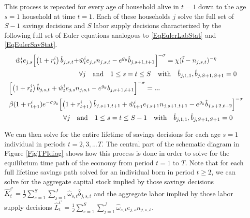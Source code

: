 \documentclass[letterpaper,12pt]{article}
\theoremstyle{definition}
\begin{document}
  This process is repeated for every age of household alive in $t=1$ down to the age $s=1$ household at time $t=1$. Each of these households $j$ solve the full set of $S-1$ savings decisions and $S$ labor supply decisions characterized by the following full set of Euler equations analogous to \eqref{EqEulerLabStat} and \eqref{EqEulerSavStat}.
  \begin{gather}
    \begin{split}
      \hat{w}^i_t e_{j,s}\Bigl[\left(1+r^i_t\right)\hat{b}_{j,s,t} + &\hat{w}^i_t e_{j,s}n_{j,s,t} - e^{g_y}\hat{b}_{j,s+1,t+1}\Bigr]^{-\sigma} = \chi(\tilde{l} - n_{j,s,t})^{-\eta} \\
      &\forall j \quad\text{and}\quad 1\leq s=t\leq S \quad\text{with}\quad \hat{b}_{j,1,1},\hat{b}_{j,S+1,S+1}=0
    \end{split} \label{EqEulerFulllabt1} \\
    \begin{split}
      &\Bigl[\left(1+r^i_t\right)\hat{b}_{j,s,t} + \hat{w}^i_t e_{j,s}n_{j,s,t} - e^{g_y}b_{j,s+1,t+1}\Bigr]^{-\sigma} = ... \\
      &\beta(1+r^i_{t+1})e^{-\sigma g_y}\Bigl[\left(1+r^i_{t+1}\right)\hat{b}_{j,s+1,t+1} + \hat{w}^i_{t+1}e_{j,s+1}n_{j,s+1,t+1} - e^{g_y}\hat{b}_{j,s+2,t+2}\Bigr]^{-\sigma} \\
      &\quad\quad\quad\quad\quad\quad\quad\quad\forall j \quad\text{and}\quad 1\leq s=t\leq S-1 \quad\text{with}\quad \hat{b}_{j,1,1},\hat{b}_{j,S+1,S+1}=0
    \end{split} \label{EqEulerFullsavt1}
  \end{gather}

  We can then solve for the entire lifetime of savings decisions for each age $s=1$ individual in periods $t=2,3,...T$. The central part of the schematic diagram in Figure \ref{FigTPIdiag} shows how this process is done in order to solve for the equilibrium time path of the economy from period $t=1$ to $T$. Note that for each full lifetime savings path solved for an individual born in period $t\geq 2$, we can solve for the aggregate capital stock implied by those savings decisions $\hat{K}_t^{i'}=\frac{1}{J}\sum_{s=1}^{S}\sum_{j=1}^{J}\hat{\omega}_{s,t}\hat{b}_{j,s,t}$ and the aggregate labor implied by those labor supply decisions $\hat{L}_t^{i'} = \frac{1}{J}\sum_{s=1}^S\sum_{j=1}^{J} \hat{\omega}_{s,t}e_{j,s}n_{j,s,t}$.
\end{document}
